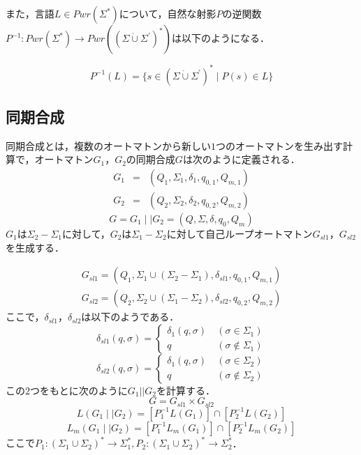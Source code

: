 また，言語$L\in Pwr(\Sigma^\ast)$について，自然な射影$P$の逆関数$P^{-1}\colon Pwr(\Sigma^\ast)\rightarrow Pwr((\Sigma\dot{\cup}\Sigma^\prime)^\ast)$は以下のようになる．

\begin{equation}
    P^{-1}(L)=\{s\in(\Sigma\dot{\cup}\Sigma^\prime)^\ast\mid P(s)\in L\}
\end{equation}


\subsection{同期合成}

同期合成とは，複数のオートマトンから新しい$1$つのオートマトンを生み出す計算で，オートマトン$G_1，G_2$の同期合成$G$は次のように定義される．
\begin{eqnarray}
    G_1&=&(Q_1,\Sigma_1,\delta_1,q_{0,1},Q_{m,1})\\
    G_2&=&(Q_2,\Sigma_2,\delta_2,q_{0,2},Q_{m,2})
\end{eqnarray}
\begin{equation}
    G=G_1\mid\mid G_2=(Q,\Sigma,\delta,q_0,Q_m)
\end{equation}
$G_1$は$\Sigma_2-\Sigma_1$に対して，$G_2$は$\Sigma_1-\Sigma_2$に対して自己ループオートマトン$G_{sl1}$，$G_{sl2}$を生成する．

\begin{eqnarray}
    G_{sl1}=(Q_1,\Sigma_1\cup(\Sigma_2-\Sigma_1),\delta_{sl1},q_{0,1},Q_{m,1})\\
    G_{sl2}=(Q_2,\Sigma_2\cup(\Sigma_1-\Sigma_2),\delta_{sl2},q_{0,2},Q_{m,2})
\end{eqnarray}
ここで，$\delta_{sl1}$，$\delta_{sl2}$は以下のようである．
\begin{equation}
    \delta_{sl1}(q,\sigma) = \begin{cases}
        \delta_1(q,\sigma)&\ (\sigma\in\Sigma_1)\\
        q&\ (\sigma\notin\Sigma_1)
        \end{cases}
\end{equation}
\begin{equation}
    \delta_{sl2}(q,\sigma) = \begin{cases}
        \delta_1(q,\sigma)&\ (\sigma\in\Sigma_2)\\
        q&\ (\sigma\notin\Sigma_2)
        \end{cases}
\end{equation}
この$2$つをもとに次のように$G_1||G_2$を計算する．
\begin{equation}
    G=G_{sl1}\times G_{sl2}
\end{equation}
\begin{equation}
    L(G_1\mid\mid G_2) = [P_1^{-1}L(G_1)]\cap[P_2^{-1}L(G_2)]
\end{equation}
\begin{equation}
    L_m(G_1\mid\mid G_2) = [P_1^{-1}L_m(G_1)]\cap[P_2^{-1}L_m(G_2)]
\end{equation}
$ここでP_1\colon(\Sigma_1\cup\Sigma_2)^\ast\rightarrow\Sigma_1^\ast, P_2\colon(\Sigma_1\cup\Sigma_2)^\ast\rightarrow\Sigma_2^\ast$．


